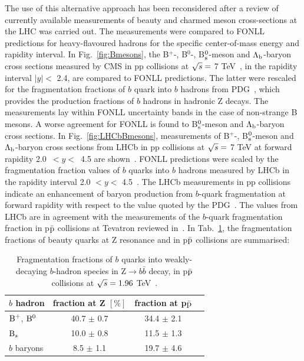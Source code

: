 The use of this alternative approach has been reconsidered after a
review of currently available measurements of beauty and 
charmed meson cross-sections at the LHC was carried out. The measurements 
were compared to FONLL predictions for heavy-flavoured hadrons 
for the specific center-of-mass energy and rapidity interval.
In Fig.~\ref{fig:Bmesons}, the B$^{+}$-, B$^{0}$-, B$^0_{\rm s}$-meson and 
$\Lambda_{\rm b}$-baryon cross sections measured by CMS in pp collisions 
at $\sqrt{s} = $ 7 TeV~\cite{Khachatryan:2011mk,Chatrchyan:2011pw,Chatrchyan:2011vh,Chatrchyan:2012xg},
in the rapidity interval $|y| <$ 2.4, are compared to FONLL predictions. 
The latter were rescaled for the fragmentation fractions of $b$ quark into 
$b$ hadrons from PDG~\cite{Patrignani:2016xqp}, which provides the production 
fractions of $b$ hadrons in hadronic Z decays.
The measurements lay within FONLL uncertainty bands in the case 
of non-strange B mesons. A worse agreement for FONLL is found to B$^0_{\rm s}$-meson
and $\Lambda_{\rm b}$-baryon cross sections.
In Fig.~\ref{fig:LHCbBmesons}, measurements of B$^{+}$-, B$^0_{\rm s}$-meson
and $\Lambda_{\rm b}$-baryon cross sections from
LHCb in pp collisions at $\sqrt{s} =$ 7 TeV at forward rapidity 
\mbox{2.0 $< y <$ 4.5} are shown~\cite{Aaij:2013noa,Aaij:2015fea}.
FONLL predictions were scaled by the fragmentation fraction values 
of $b$ quarks into $b$ hadrons measured by LHCb in the rapidity interval 
2.0 $< y <$ 4.5~\cite{Aaij:2011jp}. The LHCb measurements in pp collisions indicate an 
enhancement of baryon production from $b$-quark fragmentation at forward rapidity with respect to 
the value quoted by the PDG~\cite{Patrignani:2016xqp}. The values from LHCb are in agreement with the measurements
of the $b$-quark fragmentation fraction in p$\bar{\rm p}$ collisions at Tevatron reviewed in~\cite{Patrignani:2016xqp}.
In Tab.~\ref{tab:fragFrac}, the fragmentation fractions of beauty quarks at Z resonance and
in p$\bar{\rm p}$ collisions are summarised:\\
\begin{table}[!h]
\centering
\begin{tabular}{l|ccc}
 \hline 
\hline
$b$ hadron & fraction at Z $[\%]$  & fraction at p$\bar{\rm p}$ \\
\hline 
${\rm B}^{+}$, ${\rm B}^{0}$    &     40.7 $\pm$ 0.7   & 34.4 $\pm$ 2.1 \\
${\rm B}_{s}$                 &     10.0 $\pm$ 0.8   & 11.5 $\pm$ 1.3 \\
$b$ baryons          &       8.5 $\pm$ 1.1   & 19.7 $\pm$ 4.6 \\
 \hline 
\hline
\end{tabular}
\caption{Fragmentation fractions of $b$ quarks into weakly-decaying $b$-hadron species in Z$ \rightarrow b\bar{b}$ decay, in p$\bar{\rm p}$ collisions at $\sqrt{s} = 1.96$ TeV~\cite{Patrignani:2016xqp}.}
\label{tab:fragFrac}
\end{table}




